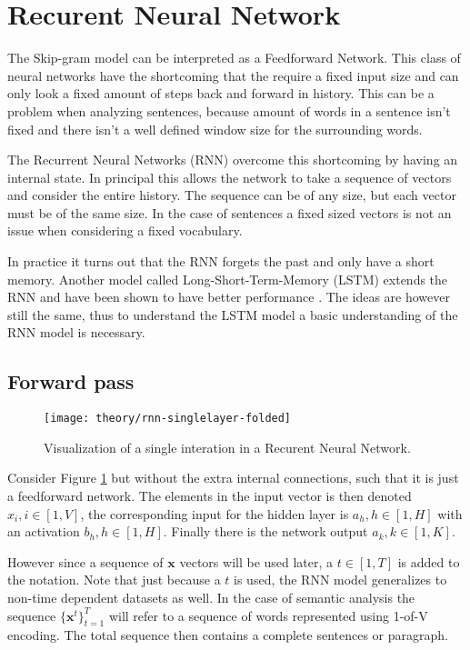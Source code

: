 
\section{Recurent Neural Network}

The Skip-gram model can be interpreted as a Feedforward Network. This class of neural networks have the shortcoming that the require a fixed input size and can only look a fixed amount of steps back and forward in history. This can be a problem when analyzing sentences, because amount of words in a sentence isn't fixed and there isn't a well defined window size for the surrounding words.

The Recurrent Neural Networks (RNN) overcome this shortcoming by having an internal state. In principal this allows the network to take a sequence of vectors and consider the entire history. The sequence can be of any size, but each vector must be of the same size. In the case of sentences a fixed sized vectors is not an issue when considering a fixed vocabulary.

In practice it turns out that the RNN forgets the past and only have a short memory. Another model called Long-Short-Term-Memory (LSTM) extends the RNN and have been shown to have better performance \cite{missing source}. The ideas are however still the same, thus to understand the LSTM model a basic understanding of the RNN model is necessary.

\subsection{Forward pass}

\begin{figure}[h]
	\centering
	\texttt{[image: theory/rnn-singlelayer-folded]}
	\caption{Visualization of a single interation in a Recurent Neural Network.}
	\label{fig:theory:rnn:rnn-singlelayer-folded}
\end{figure}

Consider Figure \ref{fig:theory:rnn:rnn-singlelayer-folded} but without the extra internal connections, such that it is just a feedforward network. The elements in the input vector is then denoted $x_{i}, i \in [1, V]$, the corresponding input for the hidden layer is $a_{h}, h \in [1, H]$ with an activation $b_{h}, h \in [1, H]$. Finally there is the network output $a_{k}, k \in [1, K]$.

However since a sequence of $\mathbf{x}$ vectors will be used later, a $t \in [1, T]$ is added to the notation. Note that just because a $t$ is used, the RNN model generalizes to non-time dependent datasets as well. In the case of semantic analysis the sequence $\{\mathbf{x}^t\}_{t=1}^T$ will refer to a sequence of words represented using 1-of-V encoding. The total sequence then contains a complete sentences or paragraph. 

